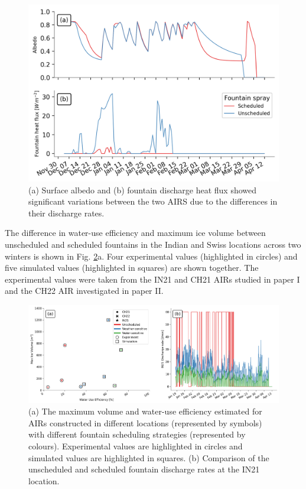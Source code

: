 \begin{figure}[htb]
\includegraphics[width=\textwidth]{figs/dis_processes.png}
\caption{(a) Surface albedo  and (b) fountain discharge heat flux showed significant variations between the two
  AIRS due to the differences in their discharge rates.}
\label{fig:dis_processes}
\end{figure}

The difference in water-use efficiency and maximum ice volume between unscheduled and scheduled fountains in the
Indian and Swiss locations across two winters is shown in Fig. \ref{fig:wue}a. Four experimental values
(highlighted in circles) and five simulated values (highlighted in squares) are shown together.  The
experimental values were taken from the IN21 and CH21 AIRs studied in paper I and the CH22 AIR investigated in
paper II. 

\begin{figure}[htb]
\includegraphics[width=\textwidth]{figs/wue.png}

\caption{(a) The maximum volume and water-use efficiency estimated for AIRs constructed in different locations
(represented by symbols) with different fountain scheduling strategies (represented by colours). Experimental
values are highlighted in circles and simulated values are highlighted in squares. (b) Comparison of
the unscheduled and scheduled fountain discharge rates at the IN21 location.}

\label{fig:wue}
\end{figure}

